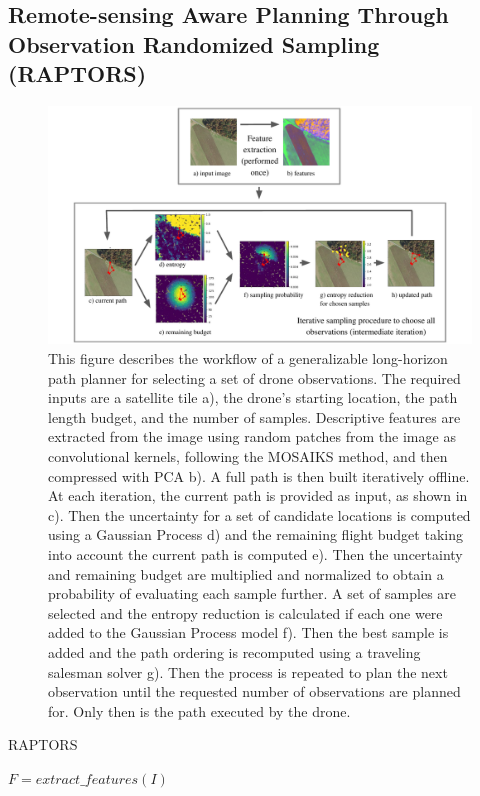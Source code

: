 \subsection{Remote-sensing Aware Planning Through Observation Randomized Sampling (RAPTORS)
}
\begin{figure}
    \centering
    \includegraphics[width=\textwidth, clip, trim={1.5cm, 0, 1.5cm, 0}]{figs/methods/IPP/RAPTORS_concept_figure.pdf}
    \caption{This figure describes the workflow of a generalizable long-horizon path planner for selecting a set of drone observations. The required inputs are a satellite tile a), the drone's starting location, the path length budget, and the number of samples. Descriptive features are extracted from the image using random patches from the image as convolutional kernels, following the MOSAIKS method, and then compressed with PCA b). A full path is then built iteratively offline. At each iteration, the current path is provided as input, as shown in c). Then the uncertainty for a set of candidate locations is computed using a Gaussian Process d) and the remaining flight budget taking into account the current path is computed e). Then the uncertainty and remaining budget are multiplied and normalized to obtain a probability of evaluating each sample further. A set of samples are selected and the entropy reduction is calculated if each one were added to the Gaussian Process model f). Then the best sample is added and the path ordering is recomputed using a traveling salesman solver g). Then the process is repeated to plan the next observation until the requested number of observations are planned for. Only then is the path executed by the drone.
}
    \label{fig:methods:IPP_raptors_overview}
\end{figure}

\begin{algorithm}
\caption{RAPTORS}\label{alg:methods:RAPTORS}
\begin{algorithmic}
\State $F = extract\_features(I)$
\end{algorithmic}
\end{algorithm}

